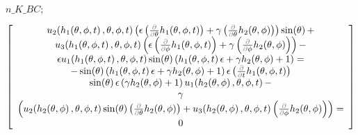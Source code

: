 \documentclass{article}
\begin{document}
\begin{Maple Normal}

\end{Maple Normal}
\begin{Maple Normal}
{$ \displaystyle \textit{n\_K\_BC} ; $}
\end{Maple Normal}
\begin{dmath}\label{(19)}
\left[\begin{array}{c}
u_{2}\! \left(h_{1}\! \left(\theta ,\phi ,t \right),\theta ,\phi ,t \right) \left(\epsilon  \left(\frac{\textcolor{gray}{\partial}}{\textcolor{gray}{\partial}\theta}h_{1}\! \left(\theta ,\phi ,t \right)\right)+\gamma  \left(\frac{\textcolor{gray}{\partial}}{\textcolor{gray}{\partial}\theta}h_{2}\! \left(\theta ,\phi \right)\right)\right) \sin \! \left(\theta \right)+
\\
u_{3}\! \left(h_{1}\! \left(\theta ,\phi ,t \right),\theta ,\phi ,t \right) \left(\epsilon  \left(\frac{\textcolor{gray}{\partial}}{\textcolor{gray}{\partial}\phi}h_{1}\! \left(\theta ,\phi ,t \right)\right)+\gamma  \left(\frac{\textcolor{gray}{\partial}}{\textcolor{gray}{\partial}\phi}h_{2}\! \left(\theta ,\phi \right)\right)\right)-
\\
\epsilon  u_{1}\! \left(h_{1}\! \left(\theta ,\phi ,t \right),\theta ,\phi ,t \right) \sin \! \left(\theta \right) \left(h_{1}\! \left(\theta ,\phi ,t \right) \epsilon +\gamma  h_{2}\! \left(\theta ,\phi \right)+1\right)=
\\
-\sin \! \left(\theta \right) \left(h_{1}\! \left(\theta ,\phi ,t \right) \epsilon +\gamma  h_{2}\! \left(\theta ,\phi \right)+1\right) \epsilon  \left(\frac{\textcolor{gray}{\partial}}{\textcolor{gray}{\partial}t}h_{1}\! \left(\theta ,\phi ,t \right)\right) 
\\
 \sin \! \left(\theta \right) \epsilon  \left(\gamma  h_{2}\! \left(\theta ,\phi \right)+1\right) u_{1}\! \left(h_{2}\! \left(\theta ,\phi \right),\theta ,\phi ,t \right)-
\\
\gamma  
\\
\left(u_{2}\! \left(h_{2}\! \left(\theta ,\phi \right),\theta ,\phi ,t \right) \sin \! \left(\theta \right) \left(\frac{\textcolor{gray}{\partial}}{\textcolor{gray}{\partial}\theta}h_{2}\! \left(\theta ,\phi \right)\right)+u_{3}\! \left(h_{2}\! \left(\theta ,\phi \right),\theta ,\phi ,t \right) \left(\frac{\textcolor{gray}{\partial}}{\textcolor{gray}{\partial}\phi}h_{2}\! \left(\theta ,\phi \right)\right)\right)=
\\
0 
\end{array}\right]
\end{dmath}
\end{document}
